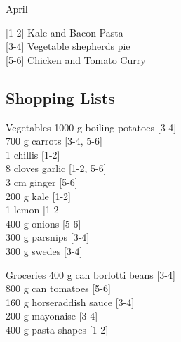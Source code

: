 		\begin{menu}{April}
    
    \begin{recipelist}
    
        {\scriptsize[1-2]} Kale and Bacon Pasta\\
        {\scriptsize[3-4]} Vegetable shepherds pie\\
        {\scriptsize[5-6]} Chicken and Tomato Curry\\
    \end{recipelist}%
    \begin{recipelist}
    
    \end{recipelist}\par%
  
    \subsection*{Shopping Lists}
      \begin{shoppinglist}{Vegetables}
      1000 g boiling potatoes 
        {\scriptsize[3-4]}\\
      700 g carrots 
        {\scriptsize[3-4, 5-6]}\\
      1  chillis 
        {\scriptsize[1-2]}\\
      8 cloves garlic 
        {\scriptsize[1-2, 5-6]}\\
      3 cm ginger 
        {\scriptsize[5-6]}\\
      200 g kale 
        {\scriptsize[1-2]}\\
      1  lemon 
        {\scriptsize[1-2]}\\
      400 g onions 
        {\scriptsize[5-6]}\\
      300 g parsnips 
        {\scriptsize[3-4]}\\
      300 g swedes 
        {\scriptsize[3-4]}\\
      \end{shoppinglist}%
      \begin{shoppinglist}{Groceries}
      400 g can borlotti beans 
        {\scriptsize[3-4]}\\
      800 g can tomatoes 
        {\scriptsize[5-6]}\\
      160 g horseraddish sauce 
        {\scriptsize[3-4]}\\
      200 g mayonaise 
        {\scriptsize[3-4]}\\
      400 g pasta shapes 
        {\scriptsize[1-2]}\\

\end{shoppinglist}
\end{menu}
